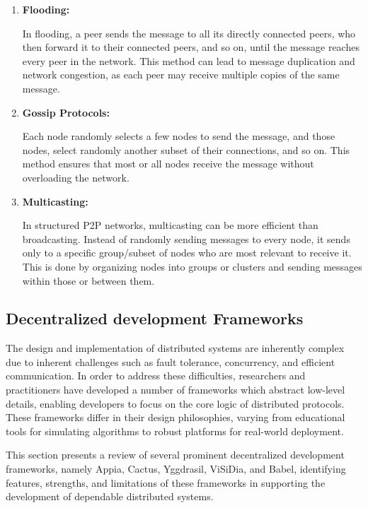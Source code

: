 \begin{enumerate}

  \item \textbf{Flooding:} 
  
  In flooding, a peer sends the message to all its directly connected peers, who then forward it to their connected peers, and so on, until the message reaches every peer in the network. This method can lead to message duplication and network congestion, as each peer may receive multiple copies of the same message.
  \item \textbf{Gossip Protocols:} 
  
  Each node randomly selects a few nodes to send the message, and those nodes, select randomly another subset of their connections, and so on. This method ensures that most or all nodes receive the message without overloading the network.
  \item \textbf{Multicasting:} 
  
  In structured \gls{P2P} networks, multicasting can be more efficient than broadcasting. Instead of randomly sending messages to every node, it sends only to a specific group/subset of nodes who are most relevant to receive it. This is done by organizing nodes into groups or clusters and sending messages within those or between them.

\end{enumerate}



\subsection{Decentralized development Frameworks}
\label{sub:decentralized_development_frameworks}

The design and implementation of distributed systems are inherently complex due to inherent challenges such as fault tolerance, concurrency, and efficient communication. In order to address these difficulties, researchers and practitioners have developed a number of frameworks which abstract low-level details, enabling developers to focus on the core logic of distributed protocols. These frameworks differ in their design philosophies, varying from educational tools for simulating algorithms to robust platforms for real-world deployment.

This section presents a review of several prominent decentralized development frameworks, namely Appia, Cactus, Yggdrasil, ViSiDia, and Babel, identifying features, strengths, and limitations of these frameworks in supporting the development of dependable distributed systems.

